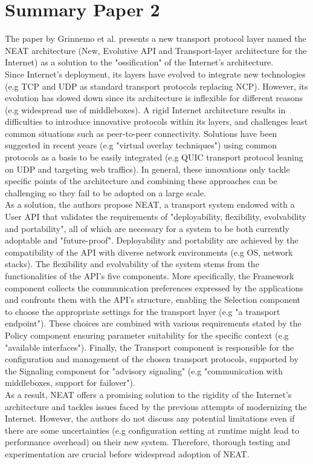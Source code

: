 \section{Summary Paper 2}%
\label{sec:Summary Paper 2}

The paper by Grinnemo et al. presents a new transport protocol layer named the NEAT architecture (New, Evolutive API and Transport-layer architecture for the Internet) as a solution to the "ossification" of the Internet's architecture. \\
Since Internet's deployment, its layers have evolved to integrate new technologies (e.g TCP and UDP as standard transport protocols replacing NCP). However, its evolution has slowed down since its architecture is inflexible for different reasons (e.g widespread use of middleboxes). A rigid Internet architecture results in difficulties to introduce innovative protocols within its layers, and challenges least common situations such as peer-to-peer connectivity. Solutions have been suggested in recent years (e.g "virtual overlay techniques") using common protocols as a basis to be easily integrated (e.g QUIC transport protocol leaning on UDP and targeting web traffics). In general, these innovations only tackle specific points of the architecture and combining these approaches can be challenging so they fail to be adopted on a large scale. \\
As a solution, the authors propose NEAT, a transport system endowed with a User API that validates the requirements of "deployability, flexibility, evolvability and portability", all of which are necessary for a system to be both currently adoptable and "future-proof". Deployability and portability are achieved by the compatibility of the API with diverse network environments (e.g OS, network stacks). The flexibility and evolvability of the system stems from the functionalities of the API's five components. More specifically, the Framework component collects the communication preferences expressed by the applications and confronts them with the API's structure, enabling the Selection component to choose the appropriate settings for the transport layer (e.g "a transport endpoint"). These choices are combined with various requirements stated by the Policy component ensuring parameter suitability for the specific context (e.g "available interfaces"). Finally, the Transport component is responsible for the configuration and management of the chosen transport protocols, supported by the Signaling component for "advisory signaling" (e.g "communication with middleboxes, support for failover").\\
As a result, NEAT offers a promising solution to the rigidity of the Internet's architecture and tackles issues faced by the previous attempts of modernizing the Internet. However, the authors do not discuss any potential limitations even if there are some uncertainties (e.g configuration setting at runtime might lead to performance overhead) on their new system. Therefore, thorough testing and experimentation are crucial before widespread adoption of NEAT. 
